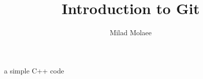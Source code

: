 \documentclass{beamer}
\author[miladmolaee@hotmail.com]{ Milad Molaee}
\title[Introduction to Git]{Introduction to Git}
\begin{document}
 
%
\frame{\titlepage}

%

\begin{frame}{a simple C++ code}

\end{frame}
%
\end{document}

